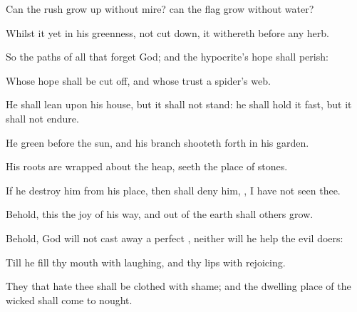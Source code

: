 {Can the
rush grow
up without
mire?
can the
flag
grow
without
water?

Whilst it
{} yet in his
greenness,
{} not cut
down, it
withereth
before any
{}
herb.

So
{} the
paths of all that
forget
God; and the
hypocrite’s
hope shall
perish:

Whose
hope shall be cut
off, and whose
trust
{} a
spider’s
web.

He shall
lean upon his
house, but it shall not
stand: he shall
hold it fast, but it shall not
endure.

He
{}
green
before the
sun, and his
branch shooteth
forth in his
garden.

His
roots are wrapped
about the
heap,
{}
seeth the
place of
stones.

If he
destroy him from his
place, then
{} shall
deny him,
{}, I have not
seen thee.

Behold, this
{} the
joy of his
way, and out of the
earth shall
others
grow.


\par }{\PP {}Behold,
God will not cast
away a
perfect
{}, neither will he
help the evil
doers:

Till he
fill thy
mouth with
laughing, and thy
lips with
rejoicing.

They that
hate thee shall be
clothed with
shame; and the
dwelling place of the
wicked shall come to
nought.




\par }
